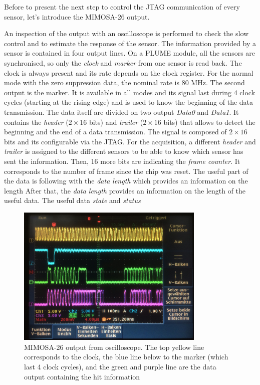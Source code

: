   Before to present the next step to control the JTAG communication of every sensor, let's introduce the MIMOSA-26 output.


  An inspection of the output with an oscilloscope is performed to check the slow control and to estimate the response of the sensor.
  The information provided by a sensor is contained in four output lines.
  On a PLUME module, all the sensors are synchronised, so only the \textit{clock} and \textit{marker} from one sensor is read back.
  The clock is always present and its rate depends on the clock register.
  For the normal mode with the zero suppression data, the nominal rate is 80 MHz. 
  The second output is the marker. 
  It is available in all modes and its signal last during 4 clock cycles (starting at the rising edge) and is used to know the beginning of the data transmission.
  The data itself are divided on two output \textit{Data0} and \textit{Data1}. 
  It contains the \textit{header} ($2 \times 16$ bits) and \textit{trailer} ($2 \times 16$ bits) that allows to detect the beginning and the end of a data transmission.
  The signal is composed of $2 \times 16$ bits and its configurable via the \gls{JTAG}.
  For the acquisition, a different \textit{header} and \textit{trailer} is assigned to the different sensors to be able to know which sensor has sent the information.
  Then, 16 more bits are indicating the \textit{frame counter}.
  It corresponds to the number of frame since the chip was reset.
  The useful part of the data is following with the \textit{data length} which provides an information on the length 
  After that, the \textit{data length} provides an information on the length of the useful data.
  The useful data \textit{state} and \textit{status}

  \begin{figure}[h]
    \centering
    \includegraphics[width=0.8\textwidth]{Pictures/labTests/mi26_output}
    \caption{MIMOSA-26 output from oscilloscope. The top yellow line corresponds to the clock, the blue line below to the marker (which last 4 clock cycles), and the green and purple line are the data output containing the hit information}
    \label{fig:mi26Output}
  \end{figure}

